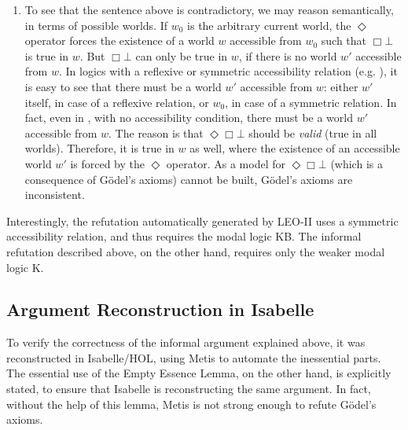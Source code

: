 \documentclass{article}
\newcommand{\Dia}{\Diamond} %
\newcommand{\nec}{\Box}
\newcommand{\pos}{\Dia}
\begin{document}
\begin{enumerate}
\item To see that the sentence above is contradictory, we may reason semantically, in terms of possible worlds. If $w_0$ is the arbitrary current world, the $\pos$ operator forces the existence of a world $w$ accessible from $w_0$ such that $\nec \bot$ is true in $w$. But $\nec \bot$ can only be true in $w$, if there is no world $w'$ accessible from $w$. In logics with a reflexive or symmetric accessibility relation (e.g. \KB), it is easy to see that there must be a world $w'$ accessible from $w$: either $w'$ itself, in case of a reflexive relation, or $w_0$, in case of a symmetric relation. In fact, even in \K, with no accessibility condition, there must be a world $w'$ accessible from $w$. The reason is that $\pos \nec \bot$ should be \emph{valid} (true in all worlds). Therefore, it is true in $w$ as well, where the existence of an accessible world $w'$ is forced by the $\pos$ operator. As a model for $\pos \nec \bot$ (which is a consequence of G\"odel's axioms) cannot be built, G\"odel's axioms are inconsistent.
\end{enumerate}

Interestingly, the refutation automatically generated by LEO-II uses a symmetric accessibility relation, and thus requires the modal logic KB. The informal refutation described above, on the other hand, requires only the weaker modal logic K.


\subsection{Argument Reconstruction in Isabelle}

To verify the correctness of the informal argument explained above, it was reconstructed in Isabelle/HOL, using Metis to automate the inessential parts. The essential use of the Empty Essence Lemma, on the other hand, is explicitly stated, to ensure that Isabelle is reconstructing the same argument. In fact, without the help of this lemma, Metis is not strong enough to refute G\"odel's axioms. 
\end{document}
